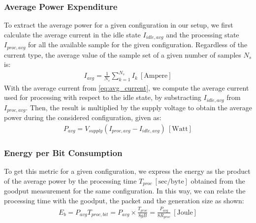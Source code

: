 \subsubsection{Average Power Expenditure}
To extract the average power for a given configuration in our setup, we
first calculate the average current in the idle state $I_{idle,avg}$
and the processing state $I_{proc,avg}$ for all the available sample for
the given configuration. Regardless of the current type, the average value
of the sample set of a given number of samples $N_s$ is:
%
\begin{align} \label{eq:avg_current}
I_{avg} = \frac{1}{N_s}\sum_{k=1}^{N_s} I_{k}  ~[\mathrm{Ampere}]
\end{align}
%
With the average current from \eqref{eq:avg_current}, we compute the average
current used for processing with respect to the idle state, by substracting
$I_{idle,avg}$ from $I_{proc,avg}$. Then, the result is multiplied by the
supply voltage to obtain the average power during the considered configuration,
given as:
%
\begin{align} \label{eq:avg_power}
P_{avg} = V_{supply}(I_{proc,avg} - I_{idle,avg}) ~[\mathrm{Watt}]
\end{align}
%
\subsubsection{Energy per Bit Consumption}
To get this metric for a given configuration, we express the energy
as the product of the average power by the processing time $T_{proc}
~[\mathrm{sec/byte}]$ obtained from the goodput measurement for the same
configuration. In this way, we can relate the processing time with the
goodput, the packet and the generation size as shown:
%
\begin{align} \label{eq:energy_per_bit}
E_b = P_{avg} T_{proc,bit} = P_{avg} \times \frac{T_{proc}}{8gB} = \frac{P_{avg}}{8R_{proc}} ~[\mathrm{Joule}]
\end{align}
%
